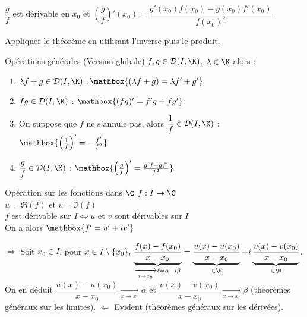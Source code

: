 \documentclass[12pt,a4paper]{report}
\begin{document}
\begin{corollaire}{}{}
\begin{center}
    $\dfrac{g}{f}$ est dérivable en $x_0$ et $\left(\dfrac{g}{f}\right)'(x_0)=  \dfrac{g'(x_0)f(x_0) - g(x_0)f'(x_0)}{f(x_0)^2}$
\end{center}
\end{corollaire}

\begin{principedemo}{}
Appliquer le théorème en utilisant l'inverse puis le produit.
\end{principedemo}

\begin{theoreme}{Opérations générales (Version globale)}{}
$f,g \in \mathcal{D} (I, \K)$, $\lambda \in \K$ alors : 
\begin{enumerate}
    \item $\lambda f+g \in \mathcal{D} (I, \K)$ :$\mathbox{(\lambda f + g)=\lambda f'+g'}$
    \item $fg \in \mathcal{D} (I, \K)$ : $\mathbox{(fg)'=f'g+fg'}$
    \item On suppose que $f$ ne s'annule pas, alors $\dfrac{1}{f}\in \mathcal{D} (I, \K)$ : $\mathbox{\left(\frac{1}{f}\right)'= - \frac{f'}{f^2}}$
    \item $\dfrac{g}{f}\in \mathcal{D} (I, \K)$ : $\mathbox{\left(\frac{g}{f}\right)'=  \frac{g'f - gf'}{f^2}}$
\end{enumerate}
\end{theoreme}

\begin{theoreme}{Opération sur les fonctions dans $\C$}{}
$f:I \to \C$\\
$u = \Re (f)$ et $v = \Im (f)$\\
$f$ est dérivable sur $I \Longleftrightarrow u$ et $v$ sont dérivables sur $I$\\
On a alors $\mathbox{f'=u'+iv'}$
\end{theoreme}

\begin{demo}{}
$\Longrightarrow$ Soit $x_0 \in I$, pour $x \in I \setminus \{x_0\}, \\
\underbrace{\dfrac{f(x)-f(x_0)}{x-x_0}}_{\xrightarrow[x \to x_0]{} \ell = \alpha+i\beta} = \underbrace{\dfrac{u(x)-u(x_0)}{x-x_0}}_{\in \R} + i \underbrace{\dfrac{v(x)-v(x_0)}{x-x_0}}_{\in \R}$. \\
On en déduit $\dfrac{u(x) - u(x_0)}{x-x_0} \xrightarrow[x \to x_0]{} \alpha$ et $\dfrac{v(x)-v(x_0)}{x-x_0} \xrightarrow[x \to x_0]{} \beta$ (théorèmes généraux sur les limites).
$\Longleftarrow$ Evident (théorèmes généraux sur les dérivées).
\end{demo}
\end{document}
